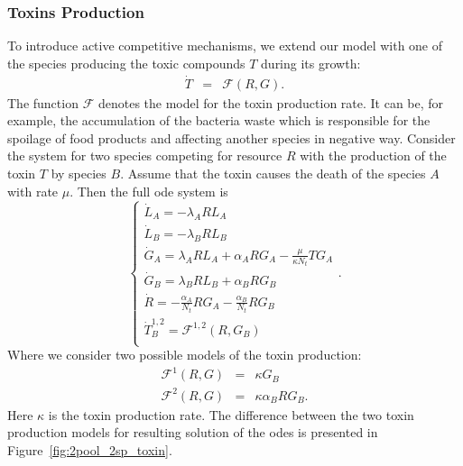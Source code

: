 \documentclass[10pt,A4paper]{article}
\begin{document}
\subsubsection{Toxins Production}
To introduce active competitive mechanisms, we extend our model with one of the species producing the toxic compounds $T$ during its growth:
\begin{eqnarray}
    \dot{T} &=& \mathcal{F}(R,G).
\end{eqnarray}
The function $\mathcal{F}$ denotes the model for the toxin production rate.
It can be, for example, the accumulation of the bacteria waste which is responsible for the spoilage of food products and affecting another species in negative way.
Consider the system for two species competing for resource $R$ with the production of the toxin $T$ by species $B$.
Assume that the toxin causes the death of the species $A$ with rate $\mu$.
Then the full \ac{ode} system is
\begin{equation}
    \begin{cases}
        \dot{L}_A = - \lambda_A R L_A\\
        \dot{L}_B = - \lambda_B R L_B \\
        \dot{G}_A = \lambda_A R L_A + \alpha_A R G_A - \frac{\mu}{\kappa N_t} T G_A\\
        \dot{G}_B = \lambda_B R L_B + \alpha_B R G_B\\ 
        \dot{R} = -\frac{\alpha_A}{N_t} R G_A-\frac{\alpha_B}{N_t} R G_B\\
        \dot{T}_{B}^{1,2} = \mathcal{F}^{1,2} (R, G_B) \\
    \end{cases}.
    \label{eq:model_2sp_toxin}
\end{equation}
%
Where we consider two possible models of the toxin production:
\begin{eqnarray}
    \mathcal{F}^1(R,G)&=&\kappa G_B\\
    \mathcal{F}^2(R,G)&=&\kappa\alpha_B R G_B.
\end{eqnarray}
Here $\kappa$ is the toxin production rate.
The difference between the two toxin production models for resulting solution of the \acp{ode} is presented in Figure~\ref{fig:2pool_2sp_toxin}.
%
%
\end{document}
